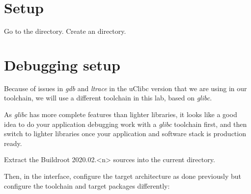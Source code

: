 
\section{Setup}

Go to the  directory.
Create an  directory.

\section{Debugging setup}

Because of issues in {\em gdb} and {\em ltrace} in the uClibc version
that we are using in our toolchain, we will use a different toolchain
in this lab, based on {\em glibc}.

As {\em glibc} has more complete features than lighter libraries,
it looks like a good idea to do your application debugging work
with a {\em glibc} toolchain first, and then switch to lighter libraries
once your application and software stack is production ready.

Extract the Buildroot 2020.02.<n> sources into the current directory.

Then, in the  interface, configure the target
architecture as done previously but configure the toolchain and
target packages differently:

